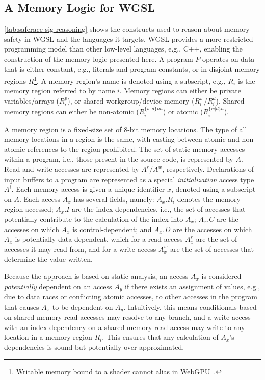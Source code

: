 \subsection{A Memory Logic for WGSL \label{sec:saferace-sr-reasoning}}

\mytablong\ref{tab:saferace-sig-reasoning} shows the constructs used to reason about memory safety in WGSL and the languages it targets. WGSL provides a more restricted programming model than other low-level languages, e.g., C++, enabling the construction of the memory logic presented here. A program $P$ operates on data that is either constant, e.g., literals and program constants, or in disjoint memory regions $R$\footnote{Writable memory bound to a shader cannot alias in WebGPU~\cite[]{webgpu}.}. A memory region's name is denoted using a subscript, e.g., $R_i$ is the memory region referred to by name $i$. Memory regions can either be private variables/arrays ($R^p_i$), or shared workgroup/device memory ($R^w_i/R^d_i$). Shared memory regions can either be non-atomic ($R^{\{w|d\}na}_i$) or atomic ($R^{\{w|d\}a}_i$).

A memory region is a fixed-size set of 8-bit memory locations. The type of all memory locations in a region is the same, with casting between atomic and non-atomic references to the region prohibited. The set of static memory accesses within a program, i.e., those present in the source code, is represented by $A$. Read and write accesses are represented by $A^r/A^w$, respectively. Declarations of input buffers to a program are represented as a special \textit{initialization} access type $A^i$. Each memory access is given a unique identifier $x$, denoted using a subscript on $A$. Each access $A_x$ has several fields, namely: $A_x.R_i$ denotes the memory region accessed; $A_x.I$ are the index dependencies, i.e., the set of accesses that potentially contribute to the calculation of the index into $A_x$; $A_x.C$ are the accesses on which $A_x$ is control-dependent; and $A_x.D$ are the accesses on which $A_x$ is potentially data-dependent, which for a read access $A^r_x$ are the set of accesses it may read from, and for a write access $A^w_x$ are the set of accesses that determine the value written.

Because the approach is based on static analysis, an access $A_x$ is considered \textit{potentially} dependent on an access $A_y$ if there exists an assignment of values, e.g., due to data races or conflicting atomic accesses, to other accesses in the program that causes $A_x$ to be dependent on $A_y$. Intuitively, this means conditionals based on shared-memory read accesses may resolve to any branch, and a write access with an index dependency on a shared-memory read access may write to any location in a memory region $R_i$. This ensures that any calculation of $A_x$'s dependencies is sound but potentially over-approximated.

